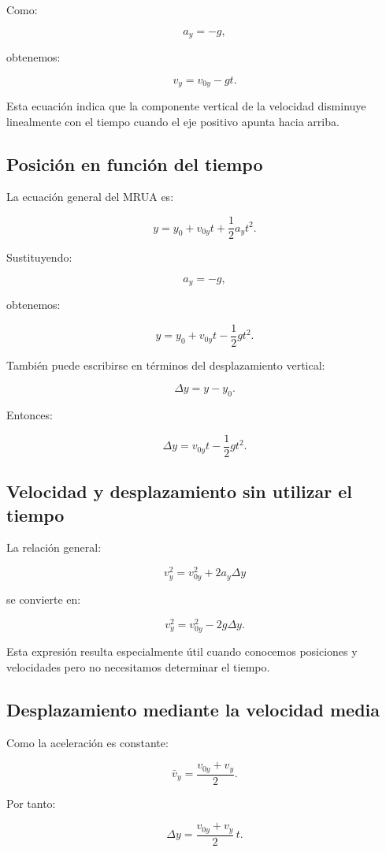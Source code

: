 Como:

\[ a_y=-g, \]

obtenemos:

\[ \boxed{v_y=v_{0y}-gt}. \]

Esta ecuación indica que la componente vertical de la velocidad disminuye linealmente con el tiempo cuando el eje positivo apunta hacia arriba.


\subsection{Posición en función del tiempo}

La ecuación general del MRUA es:

\[ y=y_0+v_{0y}t+\frac{1}{2}a_yt^2. \]

Sustituyendo:

\[ a_y=-g, \]

obtenemos:

\[ \boxed{y=y_0+v_{0y}t-\frac{1}{2}gt^2}. \]

También puede escribirse en términos del desplazamiento vertical:

\[ \Delta y=y-y_0. \]

Entonces:

\[ \boxed{\Delta y=v_{0y}t-\frac{1}{2}gt^2}. \]


\subsection{Velocidad y desplazamiento sin utilizar el tiempo}

La relación general:

\[ v_y^2=v_{0y}^2+2a_y\Delta y \]

se convierte en:

\[ \boxed{v_y^2=v_{0y}^2-2g\Delta y}. \]

Esta expresión resulta especialmente útil cuando conocemos posiciones y velocidades pero no necesitamos determinar el tiempo.


\subsection{Desplazamiento mediante la velocidad media}

Como la aceleración es constante:

\[ \bar{v}_y=\frac{v_{0y}+v_y}{2}. \]

Por tanto:

\[ \boxed{\Delta y=\frac{v_{0y}+v_y}{2}\,t}. \]

